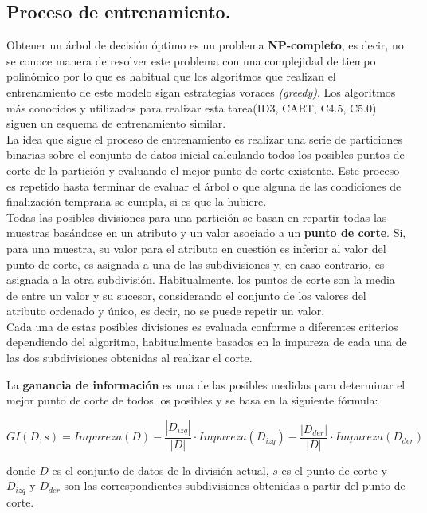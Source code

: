 \subsection{Proceso de entrenamiento.} 

Obtener un árbol de decisión óptimo es un problema \textbf{NP-completo}, es decir, no se conoce manera de resolver este problema con una complejidad de tiempo polinómico por lo que es habitual que los algoritmos que realizan el entrenamiento de este modelo sigan estrategias voraces \textit{(greedy)}. Los algoritmos más conocidos y utilizados para realizar esta tarea(ID3, CART, C4.5, C5.0) siguen un esquema de entrenamiento similar. \\

La idea que sigue el proceso de entrenamiento es realizar una serie de particiones binarias sobre el conjunto de datos inicial calculando todos los posibles puntos de corte de la partición y evaluando el mejor punto de corte existente. Este proceso es repetido hasta terminar de evaluar el árbol o que alguna de las condiciones de finalización temprana se cumpla, si es que la hubiere.\\

Todas las posibles divisiones para una partición se basan en repartir todas las muestras basándose en un atributo y un valor asociado a un \textbf{punto de corte}. Si, para una muestra, su valor para el atributo en cuestión es inferior al valor del punto de corte, es asignada a una de las subdivisiones y, en caso contrario, es asignada a la otra subdivisión. Habitualmente, los puntos de corte son la media de entre un valor y su sucesor, considerando el conjunto de los valores del atributo ordenado y único, es decir, no se puede repetir un valor.\\

Cada una de estas posibles divisiones es evaluada conforme a diferentes criterios dependiendo del algoritmo, habitualmente basados en la impureza de cada una de las dos subdivisiones obtenidas al realizar el corte. 

La \textbf{ganancia de información} es una de las posibles medidas para determinar el mejor punto de corte de todos los posibles y se basa en la siguiente fórmula:

$$
GI(D,s) = Impureza(D) - \frac{|D_{izq}|}{|D|} \cdot Impureza(D_{izq}) - \frac{|D_{der}|}{|D|} \cdot Impureza(D_{der})
$$

donde $D$ es el conjunto de datos de la división actual, $s$ es el punto de corte y $D_{izq}$ y $D_{der}$ son las correspondientes subdivisiones obtenidas a partir del punto de corte.\\

